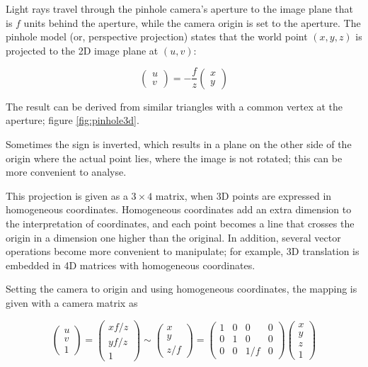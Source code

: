 Light rays travel through the pinhole camera's aperture to the image plane that is $f$ units behind the aperture, while the camera origin is set to the aperture.
The pinhole model (or, perspective projection) states that the world point $(x, y, z)$ is projected to the 2D image plane at $(u, v)$:

\begin{equation}
\begin{pmatrix}
u \\ v
\end{pmatrix}
=
-\frac{f}{z} \begin{pmatrix}
x \\ y
\end{pmatrix}
\end{equation}

The result can be derived from similar triangles with a common vertex at the aperture; figure \ref{fig:pinhole3d}.

Sometimes the sign is inverted, which results in a plane on the other side of the origin where the actual point lies, where the image is not rotated; this can be more convenient to analyse.
\cite{hartley03multiview}



This projection is given as a $3 \times 4$ matrix, when 3D points are expressed in homogeneous coordinates.
Homogeneous coordinates add an extra dimension to the interpretation of coordinates, and each point becomes a line that crosses the origin in a dimension one higher than the original.
In addition, several vector operations become more convenient to manipulate; for example, 3D translation is embedded in 4D matrices with homogeneous coordinates. \cite{hartley03multiview,heyden2005multiple}

Setting the camera to origin and using homogeneous coordinates, the mapping is given with a camera matrix as

\begin{equation}
\begin{pmatrix}
u \\ v \\ 1
\end{pmatrix}
=
\begin{pmatrix}
xf/z \\ yf/z \\ 1
\end{pmatrix}
\sim
\begin{pmatrix}
x \\ y \\ z/f
\end{pmatrix}
=
\begin{pmatrix} \label{eq:cmat}
	1 & 0 & 0 & 0 \\
	0 & 1 & 0 & 0 \\
	0 & 0 & 1/f & 0
\end{pmatrix}
\begin{pmatrix}
x \\ y \\ z \\ 1
\end{pmatrix}
\end{equation}

